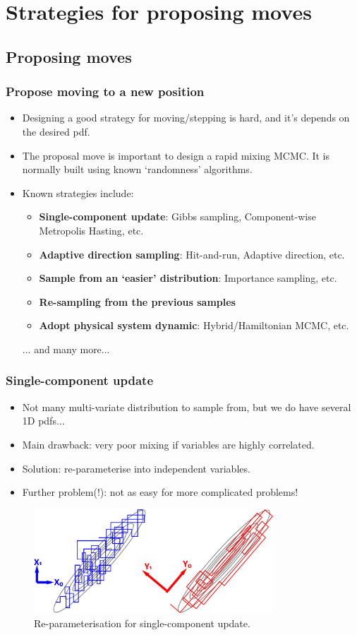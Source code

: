 \documentclass[10pt]{beamer}
\begin{document}
\section{Strategies for proposing moves}
\subsection{Proposing moves}

\begin{frame}
	\frametitle{Propose moving to a new position}
	\begin{itemize}
		\item Designing a good strategy for moving/stepping is hard, and it's depends on the desired pdf. 
		\item The proposal move is important to design a rapid mixing MCMC. It is normally built using known `randomness' algorithms.
		\item Known strategies include:
			\begin{itemize}
				\item \textbf{Single-component update}: Gibbs sampling, Component-wise Metropolis Hasting, etc.
				\item \textbf{Adaptive direction sampling}: Hit-and-run, Adaptive direction, etc.
				\item \textbf{Sample from an `easier' distribution}: Importance sampling, etc.
				\item \textbf{Re-sampling from the previous samples}
				\item \textbf{Adopt physical system dynamic}: Hybrid/Hamiltonian MCMC, etc.
			\end{itemize}
			... and many more...
	\end{itemize}
\end{frame}

\begin{frame}
	\frametitle{Single-component update}
	\begin{itemize}
		\item Not many multi-variate distribution to sample from, but we do have several 1D pdfs...
		\item Main drawback: very poor mixing if variables are highly correlated. 
		\item Solution: re-parameterise into independent variables. 
		\item Further problem(!): not as easy for more complicated problems!
	\end{itemize}
	\begin{figure}[h]
		\centering
		\includegraphics[width=0.8\textwidth]{reparameterisation}
		\caption{Re-parameterisation for single-component update.}
	\end{figure}	
\end{frame}
\end{document}

